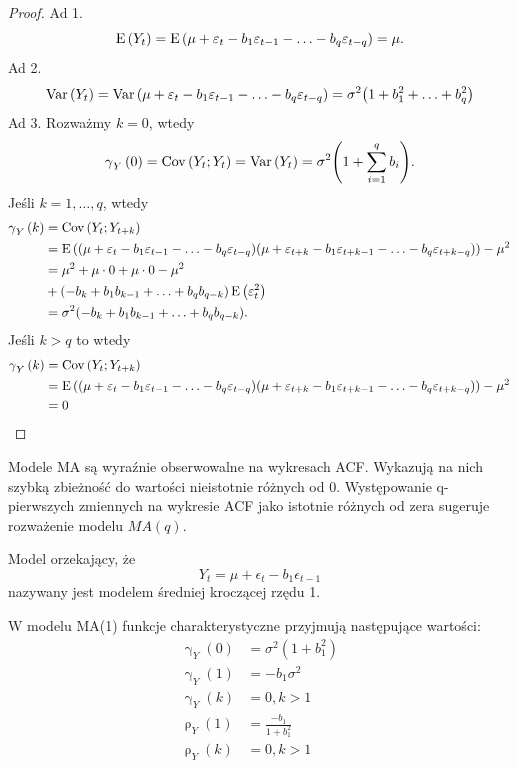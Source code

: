 \documentclass[10pt,a4paper]{book}
\newcommand{\tsAutoCovariance}[3][\gamma]{\operatorname{#1}_{#2} \left({#3}\right)}
\newcommand{\tsAutoCorellation}[3][\rho]{\operatorname{#1}_{#2} \left({#3}\right)}
\begin{document}
\begin{proof}
Ad 1. 
$$
\operatorname{E} \left({Y_t} \right) = \operatorname{E} \left({\mu + \varepsilon_t - b_1 \varepsilon_{t-1}- \ldots - b_q \varepsilon_{t-q} } \right) = \mu.
$$
Ad 2.
$$
\operatorname{Var} \left( {Y_t} \right) = \operatorname{Var} \left( {\mu + \varepsilon_t - b_1 \varepsilon_{t-1} - \ldots - b_q \varepsilon_{t-q}} \right) = \sigma^2 {\left( {1+ b_1^2 + \ldots + b_q^2} \right)}
$$
Ad 3. Rozważmy $k=0$, wtedy
$$
\tsAutoCovariance{Y}{0} = \Covariance{Y_t}{Y_{t}}= \Variance{Y_{t}} = \sigma^2 \bracket{1 + \sum_{i=1}^{q} b_i}. 
$$
Jeśli $k = 1, \ldots, q$, wtedy
\begin{align*}
\tsAutoCovariance{Y}{k} &= \Covariance{Y_t}{Y_{t+k}}\\
&= \Ex{ \bracket{\mu + \epsilon_t - b_1 \epsilon_{t-1} -\ldots - b_q \epsilon_{t-q}}
\bracket{\mu + \epsilon_{t+k} - b_1 \epsilon_{t+k-1} -\ldots - b_q \epsilon_{t+k-q}}
} - \mu^2\\
&= \mu^2 + \mu \cdot 0 + \mu \cdot 0 - \mu^2 \\
&+ (- b_k + b_1 b_{k-1} + \ldots + b_{q} b_{q-k} ) \Ex{\epsilon_t^2}\\
&= \sigma^2 (- b_k + b_1 b_{k-1} + \ldots + b_{q} b_{q-k} ).
\end{align*}
Jeśli $ k >q$ to wtedy
\begin{align*}
\tsAutoCovariance{Y}{k} &= \Covariance{Y_t}{Y_{t+k}}\\
&= \Ex{ \bracket{\mu + \epsilon_t - b_1 \epsilon_{t-1} -\ldots - b_q \epsilon_{t-q}}
\bracket{\mu + \epsilon_{t+k} - b_1 \epsilon_{t+k-1} -\ldots - b_q \epsilon_{t+k-q}}
} - \mu^2\\
&= 0
\end{align*}
\end{proof}



\begin{remark}
Modele MA są wyraźnie obserwowalne na wykresach ACF. Wykazują na nich szybką zbieżność do wartości nieistotnie różnych od 0. Występowanie q-pierwszych zmiennych na wykresie ACF jako istotnie różnych od zera sugeruje rozważenie modelu $MA(q)$.
\end{remark}

\begin{definition}[Model $MA(1)$]
Model orzekający, że 
$$
Y_t = \mu + \epsilon_t - b_1 \epsilon_{t-1}
$$
nazywany jest modelem średniej kroczącej rzędu 1.
\end{definition}

\begin{proposition}
W modelu MA(1) funkcje charakterystyczne przyjmują następujące wartości:
\begin{align*}
\tsAutoCovariance{Y}{0}&= \sigma^2 (1+ b_1^2)\\
\tsAutoCovariance{Y}{1}&= - b_1 \sigma^2\\
\tsAutoCovariance{Y}{k}&= 0, k> 1\\
\tsAutoCorellation{Y}{1}&= \frac{-b_1}{1+b_1^2}\\
\tsAutoCorellation{Y}{k}&= 0, k >1
\end{align*}
\end{proposition}
\end{document}
